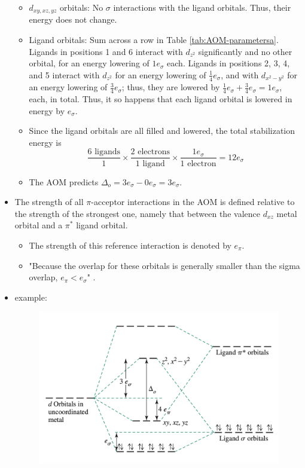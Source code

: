 \documentclass[../notes.tex]{subfiles}
\begin{document}
\begin{itemize}
\begin{itemize}
        \item $d_{xy,xz,yz}$ orbitals: No $\sigma$ interactions with the ligand orbitals. Thus, their energy does not change.
        \item Ligand orbitals: Sum across a row in Table \ref{tab:AOM-parametersa}. Ligands in positions 1 and 6 interact with $d_{z^2}$ significantly and no other orbital, for an energy lowering of $1e_\sigma$ each. Ligands in positions 2, 3, 4, and 5 interact with $d_{z^2}$ for an energy lowering of $\frac{1}{4}e_\sigma$, and with $d_{x^2-y^2}$ for an energy lowering of $\frac{3}{4}e_\sigma$; thus, they are lowered by $\frac{1}{4}e_\sigma+\frac{3}{4}e_\sigma=1e_\sigma$, each, in total. Thus, it so happens that each ligand orbital is lowered in energy by $e_\sigma$.
        \item Since the ligand orbitals are all filled and lowered, the total stabilization energy is
        \begin{equation*}
            \frac{6\text{ ligands}}{1}\times\frac{2\text{ electrons}}{1\text{ ligand}}\times\frac{1e_\sigma}{1\text{ electron}} = 12e_\sigma
        \end{equation*}
        \item The AOM predicts $\Delta_o=3e_\sigma-0e_\sigma=3e_\sigma$.
    \end{itemize}
    \item The strength of all $\pi$-acceptor interactions in the AOM is defined relative to the strength of the strongest one, namely that between the valence $d_{xz}$ metal orbital and a $\pi^*$ ligand orbital.
    \begin{itemize}
        \item The strength of this reference interaction is denoted by $e_\pi$.
        \item "Because the overlap for these orbitals is generally smaller than the sigma overlap, $e_\pi<e_\sigma$" \parencite[385]{bib:MiesslerFischerTarr}.
    \end{itemize}
    \item {} example:
    \begin{figure}[h!]
        \centering
        \includegraphics[width=0.6\linewidth]{../ExtFiles/orbitalDiagram-AOMpiAcc.png}

\end{figure}
\end{itemize}
\end{document}
